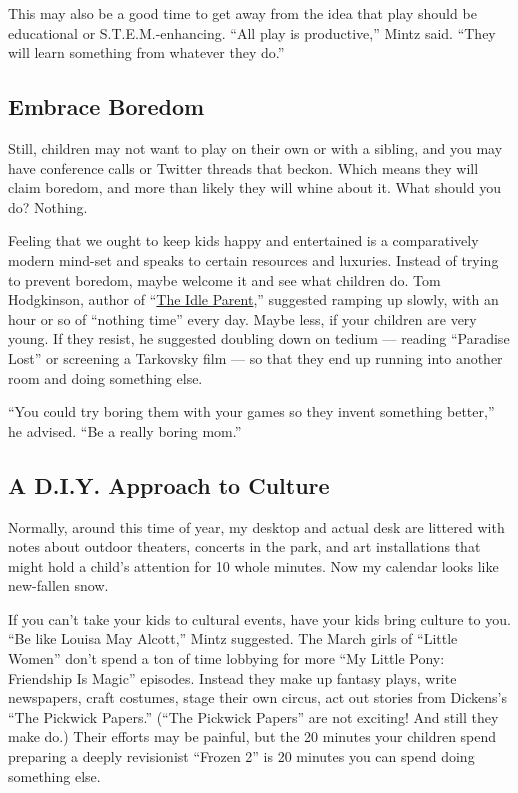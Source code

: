 This may also be a good time to get away from the idea that play should
be educational or S.T.E.M.-enhancing. ``All play is productive,'' Mintz
said. ``They will learn something from whatever they do.''

\hypertarget{embrace-boredom}{%
\subsection{Embrace Boredom}\label{embrace-boredom}}

Still, children may not want to play on their own or with a sibling, and
you may have conference calls or Twitter threads that beckon. Which
means they will claim boredom, and more than likely they will whine
about it. What should you do? Nothing.

Feeling that we ought to keep kids happy and entertained is a
comparatively modern mind-set and speaks to certain resources and
luxuries. Instead of trying to prevent boredom, maybe welcome it and see
what children do. Tom Hodgkinson, author of
``\href{https://www.penguin.co.uk/books/56063/the-idle-parent/9780141030357.html}{The
Idle Parent},'' suggested ramping up slowly, with an hour or so of
``nothing time'' every day. Maybe less, if your children are very young.
If they resist, he suggested doubling down on tedium --- reading
``Paradise Lost'' or screening a Tarkovsky film --- so that they end up
running into another room and doing something else.

``You could try boring them with your games so they invent something
better,'' he advised. ``Be a really boring mom.''

\hypertarget{a-diy-approach-to-culture}{%
\subsection{A D.I.Y. Approach to
Culture}\label{a-diy-approach-to-culture}}

Normally, around this time of year, my desktop and actual desk are
littered with notes about outdoor theaters, concerts in the park, and
art installations that might hold a child's attention for 10 whole
minutes. Now my calendar looks like new-fallen snow.

If you can't take your kids to cultural events, have your kids bring
culture to you. ``Be like Louisa May Alcott,'' Mintz suggested. The
March girls of ``Little Women'' don't spend a ton of time lobbying for
more ``My Little Pony: Friendship Is Magic'' episodes. Instead they make
up fantasy plays, write newspapers, craft costumes, stage their own
circus, act out stories from Dickens's ``The Pickwick Papers.'' (``The
Pickwick Papers'' are not exciting! And still they make do.) Their
efforts may be painful, but the 20 minutes your children spend preparing
a deeply revisionist ``Frozen 2'' is 20 minutes you can spend doing
something else.

